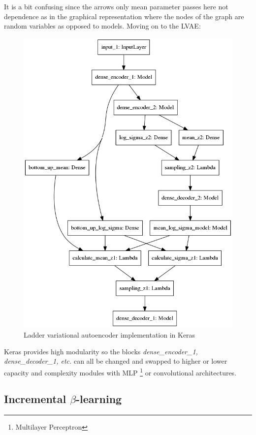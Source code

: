 \documentclass[12pt, english]{article}
\begin{document}
\par It is a bit confusing since the arrows only mean parameter passes here not dependence as in the graphical representation where the nodes of the graph are random variables as opposed to models. Moving on to the LVAE:

\vspace{4mm}

\begin{figure}[H]
    \centering
    \includegraphics[width=0.6\linewidth]{dense_lvae_keras.png}
    \caption{Ladder variational autoencoder implementation in Keras}
    \label{fig:keras_lvae}
\end{figure}

\vspace{4mm}

\par Keras provides high modularity so the blocks \textit{dense\_encoder\_1, dense\_decoder\_1, etc.} can all be
changed and swapped to higher or lower capacity and complexity modules with MLP \footnote{Multilayer Perceptron} or convolutional architectures.

\vspace{5mm}

\subsection{Incremental $\beta$-learning}

\vspace{5mm}
\end{document}
